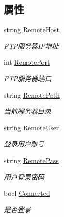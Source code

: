 \subsection*{属性}
\begin{DoxyCompactItemize}
\item 
string \hyperlink{class_x_c_l_net_tools_1_1_f_t_p_1_1_f_t_p_client_a020891b3ab32deba2b8e2b2204349f1d}{Remote\-Host}
\begin{DoxyCompactList}\small\item\em F\-T\-P服务器\-I\-P地址 \end{DoxyCompactList}\item 
int \hyperlink{class_x_c_l_net_tools_1_1_f_t_p_1_1_f_t_p_client_af47bf07406237f3bd179472debf9c84d}{Remote\-Port}
\begin{DoxyCompactList}\small\item\em F\-T\-P服务器端口 \end{DoxyCompactList}\item 
string \hyperlink{class_x_c_l_net_tools_1_1_f_t_p_1_1_f_t_p_client_a6dd534c17624097f4c29442ce3e5a176}{Remote\-Path}
\begin{DoxyCompactList}\small\item\em 当前服务器目录 \end{DoxyCompactList}\item 
string \hyperlink{class_x_c_l_net_tools_1_1_f_t_p_1_1_f_t_p_client_ab97c698dca9a54f44b1e69cb15c1126d}{Remote\-User}
\begin{DoxyCompactList}\small\item\em 登录用户账号 \end{DoxyCompactList}\item 
string \hyperlink{class_x_c_l_net_tools_1_1_f_t_p_1_1_f_t_p_client_a89a0c18691dfde35bdb46696a0344bff}{Remote\-Pass}
\begin{DoxyCompactList}\small\item\em 用户登录密码 \end{DoxyCompactList}\item 
bool \hyperlink{class_x_c_l_net_tools_1_1_f_t_p_1_1_f_t_p_client_af3e0775ddf1dc1530b82b5b0a6aa4d25}{Connected}
\begin{DoxyCompactList}\small\item\em 是否登录 \end{DoxyCompactList}\end{DoxyCompactItemize}


